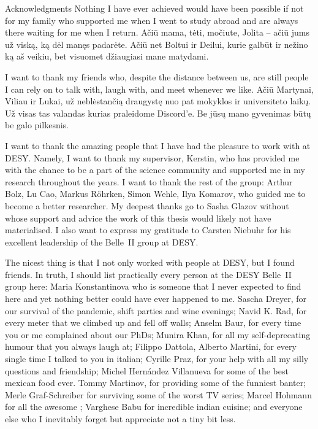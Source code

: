 \begin{abstractpage}{Acknowledgments}
    Nothing I have ever achieved would have been possible if not for my family who supported me
    when I went to study abroad and are always there waiting for me when I return.
    Ačiū mama, tėti, močiute, Jolita -- ačiū jums už viską, ką dėl manęs padarėte.
    Ačiū net Boltui ir Deilui, kurie galbūt ir nežino ką aš veikiu, bet visuomet džiaugiasi mane matydami.

    I want to thank my friends who, despite the distance between us, are still people I can rely on to talk with,
    laugh with, and meet whenever we like.
    Ačiū Martynai, Viliau ir Lukai, už neblėstančią draugystę nuo pat mokyklos ir universiteto laikų.
    Už visas tas valandas kurias praleidome Discord'e.
    Be jūsų mano gyvenimas būtų be galo pilkesnis.

    I want to thank the amazing people that I have had the pleasure to work with at DESY.
    Namely, I want to thank my supervisor, Kerstin, who has provided me with the chance to be a part of the science community
    and supported me in my research throughout the years.
    I want to thank the rest of the group: Arthur Bolz, Lu Cao, Markus R\"ohrken, Simon Wehle, Ilya Komarov, who guided me to become a better researcher.
    My deepest thanks go to Sasha Glazov without whose support and advice the work of this thesis would likely not have materialised.
    I also want to express my gratitude to Carsten Niebuhr for his excellent leadership of the Belle~II group at DESY.

    The nicest thing is that I not only worked with people at DESY, but I found friends.
    In truth, I should list practically every person at the DESY Belle~II group here:
    Maria Konstantinova who is someone that I never expected to find here and yet nothing better could have ever happened to me.
    Sascha Dreyer, for our survival of the pandemic, shift parties and wine evenings;
    Navid K. Rad, for every meter that we climbed up and fell off walls;
    Anselm Baur, for every time you or me complained about our PhDs;
    Munira Khan, for all my self-deprecating humour that you always laugh at;
    Filippo Dattola, Alberto Martini, for every single time I talked to you in italian;
    Cyrille Praz, for your help with all my silly questions and friendship;
    Michel Hern\'andez Villanueva for some of the best mexican food ever.
    Tommy Martinov, for providing some of the funniest banter;
    Merle Graf-Schreiber for surviving some of the worst TV series;
    Marcel Hohmann for all the awesome ;
    Varghese Babu for incredible indian cuisine;
    and everyone else who I inevitably forget but appreciate not a tiny bit less.
    

\end{abstractpage}
